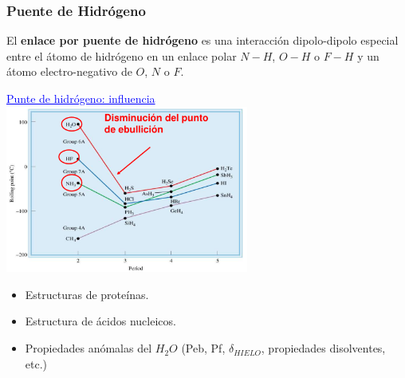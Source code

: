         \subsubsection{Puente de Hidrógeno}
            \sangria{} El \textbf{enlace por puente de hidrógeno} es una interacción dipolo-dipolo especial entre el átomo de hidrógeno en un enlace polar $N-H$, $O-H$ o $F-H$ y un átomo electro-negativo de $O$, $N$ o $F$.
            \saltoPag{}
            \begin{center} \textcolor{blue}{\underline{Punte de hidrógeno: influencia}} \\[10pt] \includegraphics[width=8cm]{./imagenes/influenciaPuenteHidrogeno.png} \end{center}
            \begin{itemize}
                \item Estructuras de proteínas.
                \item Estructura de ácidos nucleicos.
                \item Propiedades anómalas del $H_2O$ (Peb, Pf, $\delta_{HIELO}$, propiedades disolventes, etc.)
            \end{itemize}
